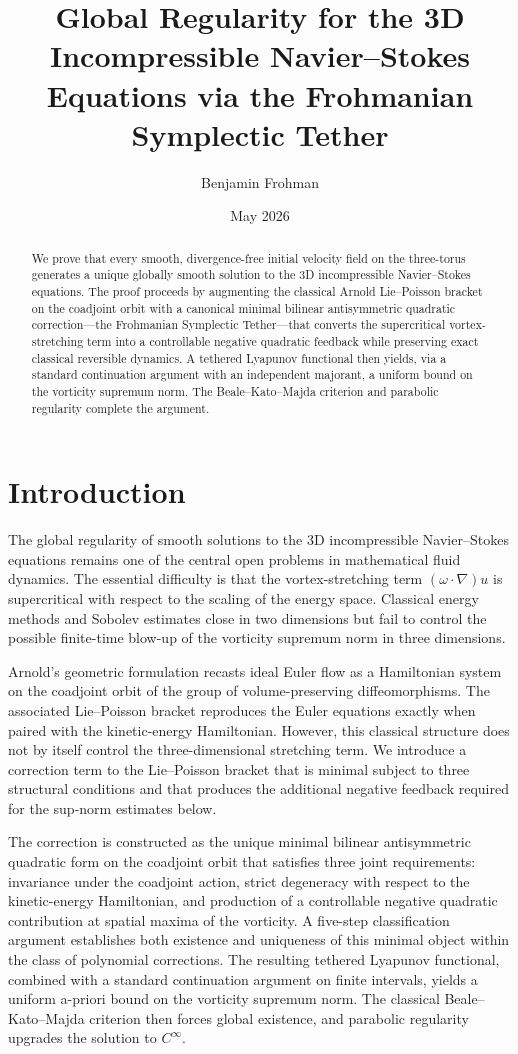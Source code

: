 \documentclass[11pt,a4paper]{article}
\title{\textbf{Global Regularity for the 3D Incompressible Navier--Stokes Equations via the Frohmanian Symplectic Tether}}
\author{Benjamin Frohman}
\date{May 2026}
\begin{document}
\maketitle

\begin{abstract}
We prove that every smooth, divergence-free initial velocity field on the three-torus generates a unique globally smooth solution to the 3D incompressible Navier--Stokes equations. The proof proceeds by augmenting the classical Arnold Lie--Poisson bracket on the coadjoint orbit with a canonical minimal bilinear antisymmetric quadratic correction---the Frohmanian Symplectic Tether---that converts the supercritical vortex-stretching term into a controllable negative quadratic feedback while preserving exact classical reversible dynamics. A tethered Lyapunov functional then yields, via a standard continuation argument with an independent majorant, a uniform bound on the vorticity supremum norm. The Beale--Kato--Majda criterion and parabolic regularity complete the argument.
\end{abstract}

\section{Introduction}

The global regularity of smooth solutions to the 3D incompressible Navier--Stokes equations remains one of the central open problems in mathematical fluid dynamics. The essential difficulty is that the vortex-stretching term \((\omega \cdot \nabla)u\) is supercritical with respect to the scaling of the energy space. Classical energy methods and Sobolev estimates close in two dimensions but fail to control the possible finite-time blow-up of the vorticity supremum norm in three dimensions.

Arnold's geometric formulation recasts ideal Euler flow as a Hamiltonian system on the coadjoint orbit of the group of volume-preserving diffeomorphisms. The associated Lie--Poisson bracket reproduces the Euler equations exactly when paired with the kinetic-energy Hamiltonian. However, this classical structure does not by itself control the three-dimensional stretching term. We introduce a correction term to the Lie--Poisson bracket that is minimal subject to three structural conditions and that produces the additional negative feedback required for the sup-norm estimates below.

The correction is constructed as the unique minimal bilinear antisymmetric quadratic form on the coadjoint orbit that satisfies three joint requirements: invariance under the coadjoint action, strict degeneracy with respect to the kinetic-energy Hamiltonian, and production of a controllable negative quadratic contribution at spatial maxima of the vorticity. A five-step classification argument establishes both existence and uniqueness of this minimal object within the class of polynomial corrections. The resulting tethered Lyapunov functional, combined with a standard continuation argument on finite intervals, yields a uniform a-priori bound on the vorticity supremum norm. The classical Beale--Kato--Majda criterion then forces global existence, and parabolic regularity upgrades the solution to \(C^\infty\).
\end{document}
